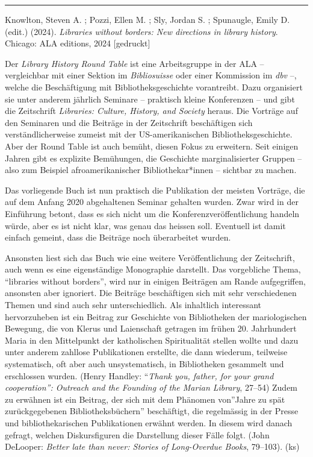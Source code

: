 \documentclass[a4paper,
fontsize=11pt,
oneside,
numbers=noperiodatend,
parskip=half-,
bibliography=totoc,
final
]{scrartcl}
\begin{document}
\begin{center}\rule{0.5\linewidth}{0.5pt}\end{center}

Knowlton, Steven A. ; Pozzi, Ellen M. ; Sly, Jordan S. ; Spunaugle,
Emily D. (edit.) (2024). \emph{Libraries without borders: New directions
in library history}. Chicago: ALA editions, 2024 {[}gedruckt{]}

Der \emph{Library History Round Table} ist eine Arbeitsgruppe in der ALA
-- vergleichbar mit einer Sektion im \emph{Bibliosuisse} oder einer
Kommission im \emph{dbv} --, welche die Beschäftigung mit
Bibliotheksgeschichte vorantreibt. Dazu organisiert sie unter anderem
jährlich Seminare -- praktisch kleine Konferenzen -- und gibt die
Zeitschrift \emph{Libraries: Culture, History, and Society} heraus. Die
Vorträge auf den Seminaren und die Beiträge in der Zeitschrift
beschäftigen sich verständlicherweise zumeist mit der US-amerikanischen
Bibliotheksgeschichte. Aber der Round Table ist auch bemüht, diesen
Fokus zu erweitern. Seit einigen Jahren gibt es explizite Bemühungen,
die Geschichte marginalisierter Gruppen -- also zum Beispiel
afroamerikanischer Bibliothekar*innen -- sichtbar zu machen.

Das vorliegende Buch ist nun praktisch die Publikation der meisten
Vorträge, die auf dem Anfang 2020 abgehaltenen Seminar gehalten wurden.
Zwar wird in der Einführung betont, dass es sich nicht um die
Konferenzveröffentlichung handeln würde, aber es ist nicht klar, was
genau das heissen soll. Eventuell ist damit einfach gemeint, dass die
Beiträge noch überarbeitet wurden.

Ansonsten liest sich das Buch wie eine weitere Veröffentlichung der
Zeitschrift, auch wenn es eine eigenständige Monographie darstellt. Das
vorgebliche Thema, ``libraries without borders'', wird nur in einigen
Beiträgen am Rande aufgegriffen, ansonsten aber ignoriert. Die Beiträge
beschäftigen sich mit sehr verschiedenen Themen und sind auch sehr
unterschiedlich. Als inhaltlich interessant hervorzuheben ist ein
Beitrag zur Geschichte von Bibliotheken der mariologischen Bewegung, die
von Klerus und Laienschaft getragen im frühen 20. Jahrhundert Maria in
den Mittelpunkt der katholischen Spiritualität stellen wollte und dazu
unter anderem zahllose Publikationen erstellte, die dann wiederum,
teilweise systematisch, oft aber auch unsystematisch, in Bibliotheken
gesammelt und erschlossen wurden. (Henry Handley: ``\emph{Thank you,
father, for your grand cooperation'': Outreach and the Founding of the
Marian Library}, 27--54) Zudem zu erwähnen ist ein Beitrag, der sich mit
dem Phänomen von''Jahre zu spät zurückgegebenen Bibliotheksbüchern''
beschäftigt, die regelmässig in der Presse und bibliothekarischen
Publikationen erwähnt werden. In diesem wird danach gefragt, welchen
Diskursfiguren die Darstellung dieser Fälle folgt. (John DeLooper:
\emph{Better late than never: Stories of Long-Overdue Books}, 79--103).
(ks)
\end{document}
